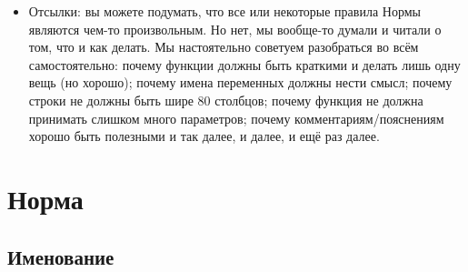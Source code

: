 \documentclass{42-ru}
\begin{document}
\begin{itemize}
        \item Отсылки: вы можете подумать, что все или некоторые правила Нормы являются чем-то произвольным.
            Но нет, мы вообще-то думали и читали о том, что и как делать. Мы настоятельно советуем разобраться
            во всём самостоятельно: почему функции должны быть краткими и делать лишь одну вещь (но хорошо);
            почему имена переменных должны нести смысл; почему строки не должны быть шире 80 столбцов;
            почему функция не должна принимать слишком много параметров; почему
            комментариям/пояснениям хорошо быть полезными и так далее, и далее, и ещё раз далее.

    \end{itemize}

    \newpage


\chapter{Норма}


    \section{Именование}
\end{document}
